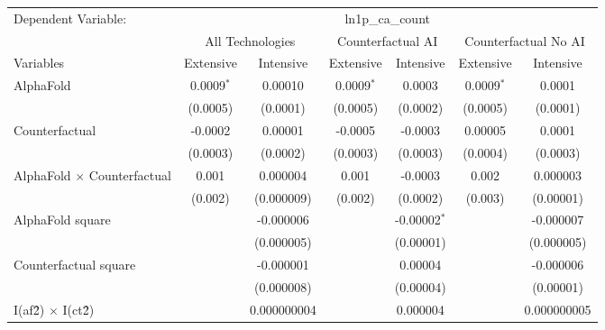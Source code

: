 \begingroup
\centering
\begin{tabular}{lcccccc}
   \tabularnewline \midrule \midrule
   Dependent Variable: & \multicolumn{6}{c}{ln1p\_ca\_count}\\
 & \multicolumn{2}{c}{All Technologies} & \multicolumn{2}{c}{Counterfactual AI} & \multicolumn{2}{c}{Counterfactual No AI} \\
\cmidrule(lr){1-1}\cmidrule(lr){2-3} \cmidrule(lr){4-5} \cmidrule(lr){6-7}
Variables & \multicolumn{1}{c}{Extensive} & \multicolumn{1}{c}{Intensive} & \multicolumn{1}{c}{Extensive} & \multicolumn{1}{c}{Intensive} & \multicolumn{1}{c}{Extensive} & \multicolumn{1}{c}{Intensive} \\
\cmidrule(lr){1-1}\cmidrule(lr){2-2} \cmidrule(lr){3-3} \cmidrule(lr){4-4} \cmidrule(lr){5-5} \cmidrule(lr){6-6} \cmidrule(lr){7-7}
   AlphaFold                          & 0.0009$^{*}$ & 0.00010       & 0.0009$^{*}$ & 0.0003         & 0.0009$^{*}$ & 0.0001\\   
                                      & (0.0005)     & (0.0001)      & (0.0005)     & (0.0002)       & (0.0005)     & (0.0001)\\   
   Counterfactual                     & -0.0002      & 0.00001       & -0.0005      & -0.0003        & 0.00005      & 0.0001\\   
                                      & (0.0003)     & (0.0002)      & (0.0003)     & (0.0003)       & (0.0004)     & (0.0003)\\   
   AlphaFold $\times$ Counterfactual  & 0.001        & 0.000004      & 0.001        & -0.0003        & 0.002        & 0.000003\\   
                                      & (0.002)      & (0.000009)    & (0.002)      & (0.0002)       & (0.003)      & (0.00001)\\   
   AlphaFold square                   &              & -0.000006     &              & -0.00002$^{*}$ &              & -0.000007\\   
                                      &              & (0.000005)    &              & (0.00001)      &              & (0.000005)\\   
   Counterfactual square              &              & -0.000001     &              & 0.00004        &              & -0.000006\\   
                                      &              & (0.000008)    &              & (0.00004)      &              & (0.00001)\\   
   I(af\^2) $\times$ I(ct\^2)         &              & 0.000000004   &              & 0.000004       &              & 0.000000005\\   

\end{tabular}
